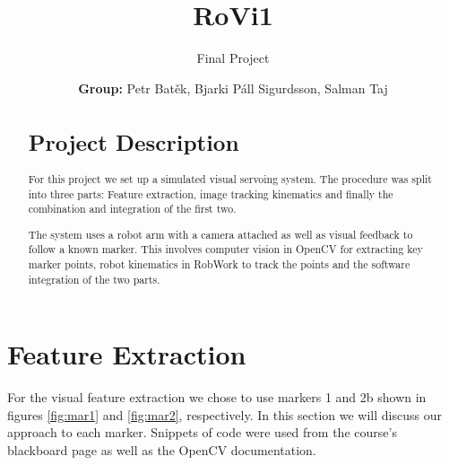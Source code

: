 \documentclass[]{scrartcl}
\title{RoVi1}
\subtitle{Final Project \vspace{2cm}}
\author{\textbf{Group:} Petr Batěk,  Bjarki Páll Sigurdsson, Salman Taj}
\begin{document}
	
	\maketitle
	
	\newpage

\begin{abstract}
\section*{Project Description}
For this project we set up a simulated visual servoing system. The procedure was split into three parts: Feature extraction, image tracking kinematics and finally the combination and integration of the first two.\par
The system uses a robot arm with a camera attached as well as visual feedback to follow a known marker. This involves computer vision in OpenCV for extracting key marker points, robot kinematics in RobWork to track the points and the software integration of the two parts.\par

\end{abstract}

\section{Feature Extraction}
For the visual feature extraction we chose to use markers 1 and 2b shown in figures \ref{fig:mar1} and \ref{fig:mar2}, respectively. In this section we will discuss our approach to each marker. Snippets of code were used from the course's blackboard page as well as the OpenCV documentation\cite{stefan}\cite{opencv}.
\end{document}
